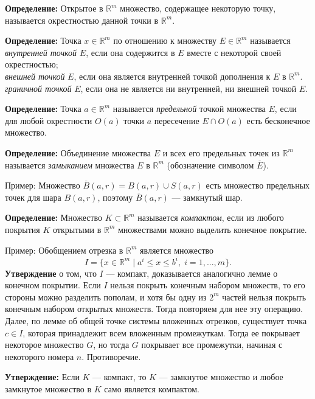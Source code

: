 \documentclass[12pt]{article}
\begin{document}
   \textbf{Определение:} Открытое в $\mathbb{R}^m$ множество, содержащее некоторую точку, называется окрестностью данной точки в $\mathbb{R}^m$.
    
   \textbf{Определение:} Точка $x \in \mathbb{R}^m $ по отношению к множеству $E \in \mathbb{R}^m$ называется \\
  \textit{внутренней точкой} $E$, если она содержится в $E$ вместе с некоторой своей окрестностью; \\
  \textit{внешней точкой} $E$, если она является внутренней точкой дополнения к $E$ в $\mathbb{R}^m$. \\
  \textit{граничной точкой} $E$, если она не является ни внутренней, ни внешней точкой $E$.
  
  \textbf{Определение:} Точка $a \in \mathbb{R}^m$ называется \textit{предельной} точкой  множества $E$, если для любой окрестности $O(a)$ точки $a$ пересечение $E \cap O(a)$ есть бесконечное множество. 
  
 \textbf{Определение:} Объединение множества $E$ и всех его предельных точек из $\mathbb{R}^m$ называется \textit{замыканием} множества $E$ в $\mathbb{R}^m$ (обозначение символом $\overline{E}$).
 
 Пример: Множество $\overline{B}(a,r) = B(a,r) \cup S(a,r)$ есть множество предельных точек для шара $B(a,r)$, поэтому $\overline{B}(a,r)$ --- замкнутый шар.
 
 \textbf{Определение:} Множество $K \subset \mathbb{R}^m$ называется \textit{компактом}, если из любого покрытия $K$ открытыми в $\mathbb{R}^m$ множествами можно выделить конечное покрытие. 
 
 Пример: Обобщением отрезка в $\mathbb{R}^m$ является множество
 $$	
 	I = \{ x \in \mathbb{R}^m \; | \; a^i \leq x \leq b^i, \; i = 1,...,m \}.
 $$ 
 \textbf{Утверждение} о том, что $I$ --- компакт, доказывается аналогично лемме о конечном покрытии. Если $I$ нельзя покрыть конечным набором множеств, то его стороны можно разделить пополам, и хотя бы одну из $2^m$ частей нельзя покрыть конечным набором открытых множеств. Тогда повторяем для нее эту операцию. Далее, по лемме об общей  точке системы вложенных отрезков, существует точка $c \in I$, которая принадлежит всем вложенным промежуткам. Тогда ее покрывает некоторое множество $G$, но тогда $G$ покрывает все промежутки, начиная с некоторого номера $n$. Противоречие.


\textbf{Утверждение:} Если $K$ --- компакт, то $K$ --- замкнутое множество и любое замкнутое множество в $K$ само является компактом. 
\end{document}
